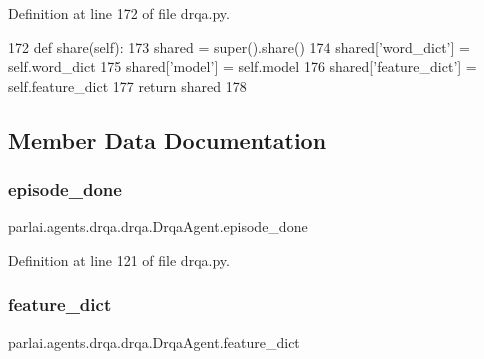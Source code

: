 Definition at line 172 of file drqa.\+py.


\begin{DoxyCode}
172     \textcolor{keyword}{def }share(self):
173         shared = super().share()
174         shared[\textcolor{stringliteral}{'word\_dict'}] = self.word\_dict
175         shared[\textcolor{stringliteral}{'model'}] = self.model
176         shared[\textcolor{stringliteral}{'feature\_dict'}] = self.feature\_dict
177         \textcolor{keywordflow}{return} shared
178 
\end{DoxyCode}


\subsection{Member Data Documentation}
\mbox{\label{classparlai_1_1agents_1_1drqa_1_1drqa_1_1DrqaAgent_a313e13a6e6d878e5e37c5d27d8daed78}} 
\subsubsection{\texorpdfstring{episode\+\_\+done}{episode\_done}}
{\footnotesize\ttfamily parlai.\+agents.\+drqa.\+drqa.\+Drqa\+Agent.\+episode\+\_\+done}



Definition at line 121 of file drqa.\+py.

\mbox{\label{classparlai_1_1agents_1_1drqa_1_1drqa_1_1DrqaAgent_aad3576cea9fa96bdb5bf3d9a6209c93c}} 
\subsubsection{\texorpdfstring{feature\+\_\+dict}{feature\_dict}}
{\footnotesize\ttfamily parlai.\+agents.\+drqa.\+drqa.\+Drqa\+Agent.\+feature\+\_\+dict}



